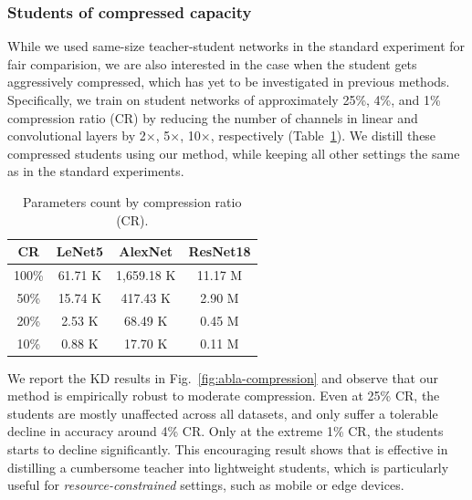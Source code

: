 \subsubsection{Students of compressed capacity} \label{sssec:04-experiments-ablation-compress}

\begin{foldable}
    While we used same-size teacher-student networks in the standard experiment for fair comparision, we are also interested in the case when the student gets aggressively compressed, which has yet to be investigated in previous methods.
    Specifically, we train on student networks of approximately 25\%, 4\%, and 1\% compression ratio (CR) by reducing the number of channels in linear and convolutional layers by 2$\times$, 5$\times$, 10$\times$, respectively (Table~\ref{tab:abla-compression-parameters}).
    We distill these compressed students using our method, while keeping all other settings the same as in the standard experiments.
\end{foldable}

\begin{table}[h]
    \caption{Parameters count by compression ratio (CR).}
    \label{tab:abla-compression-parameters}
    \centering
    \begin{tabular}{c|c|c|c}
        \hline  \textbf{CR} & \textbf{LeNet5}   & \textbf{AlexNet}     & \textbf{ResNet18} \\
        \hline        100\% &           61.71 K &           1,659.18 K &           11.17 M \\
            \phantom{0}50\% &           15.74 K & \phantom{0,}417.43 K & \phantom{0}2.90 M \\
            \phantom{0}20\% & \phantom{0}2.53 K & \phantom{0,0}68.49 K & \phantom{0}0.45 M \\
            \phantom{0}10\% & \phantom{0}0.88 K & \phantom{0,0}17.70 K & \phantom{0}0.11 M \\
        \hline
    \end{tabular}
\end{table}

\begin{foldable}
    We report the KD results in Fig.~\ref{fig:abla-compression} and observe that our method is empirically robust to moderate compression.
    Even at 25\% CR, the students are mostly unaffected across all datasets, and only suffer a tolerable decline in accuracy around 4\% CR.
    Only at the extreme 1\% CR, the students starts to decline significantly.
    This encouraging result shows that {\methodname} is effective in distilling a cumbersome teacher into lightweight students, which is particularly useful for \textit{resource-constrained} settings, such as mobile or edge devices. 
\end{foldable}

